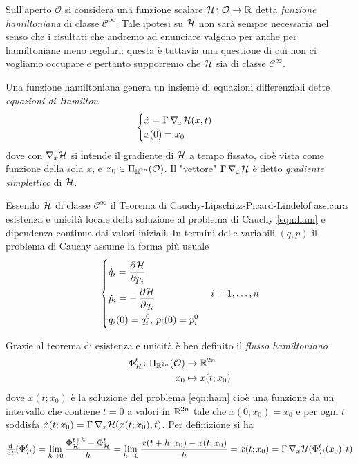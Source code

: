 Sull'aperto $ \mathcal{O} $ si considera una funzione scalare $ \mathcal{H} \colon \mathcal{O} \to \mathbb{R} $ detta \emph{funzione hamiltoniana} di classe $ \mathcal{C}^{\infty} $. Tale ipotesi su $ \mathcal{H} $ non sarà sempre necessaria nel senso che i risultati che andremo ad enunciare valgono per anche per hamiltoniane meno regolari: questa è tuttavia una questione di cui non ci vogliamo occupare e pertanto supporremo che $ \mathcal{H} $ sia di classe $ \mathcal{C}^\infty $.

Una funzione hamiltoniana genera un insieme di equazioni differenziali dette \emph{equazioni di Hamilton}
\begin{equation} \label{eqn:ham}
    \begin{cases}
    \dot{x} = \Gamma \, \nabla_x \mathcal{H}(x, t) \\
    x(0) = x_0
    \end{cases}
\end{equation}
dove con $ \nabla_x \mathcal{H} $ si intende il gradiente di $ \mathcal{H} $ a tempo fissato, cioè vista come funzione della sola $ x $, e $ x_0 \in \Pi_{\mathbb{R}^{2n}}(\mathcal{O}) $. Il "vettore" $ \Gamma \, \nabla_x \mathcal{H} $ è detto \emph{gradiente simplettico} di $ \mathcal{H} $.

Essendo $ \mathcal{H} $ di classe $ \mathcal{C}^\infty $ il Teorema di Cauchy-Lipschitz-Picard-Lindelöf assicura esistenza e unicità locale della soluzione al problema di Cauchy \eqref{eqn:ham} e dipendenza continua dai valori iniziali. In termini delle variabili $ (q, p) $ il problema di Cauchy assume la forma più usuale
\begin{equation}
    \begin{dcases}
        \dot{q}_i = \dpd{\ham}{p_i} \\
        \dot{p}_i = -\dpd{\ham}{q_i} \\
        q_i(0) = q_{i}^0, \, p_i(0) = p_i^0 \\
    \end{dcases}
    \quad i = 1, \ldots, n
\end{equation}

Grazie al teorema di esistenza e unicità è ben definito il \emph{flusso hamiltoniano}
\begin{align}
    \Phi_{\mathcal{H}}^t \colon \Pi_{\mathbb{R}^{2n}}(\mathcal{O}) & \to \mathbb{R}^{2n} \\
    x_0 & \mapsto x(t; x_0)
\end{align}
dove $ x(t; x_0) $ è la soluzione del problema \eqref{eqn:ham} cioè una funzione da un intervallo che contiene $ t=0 $ a valori in $ \mathbb{R}^{2n} $ tale che $ x(0; x_0) = x_0 $ e per ogni $ t $ soddisfa $ \dot{x}(t; x_0) = \Gamma \, \nabla_x \mathcal{H}(x(t; x_0), t) $. Per definizione si ha
\[
    \od{}{t} (\Phi^t_\ham) = \lim_{h \to 0} \frac{\Phi^{t+h}_\ham - \Phi^{t}_\ham}{h} = \lim_{h \to 0} \frac{x(t+h; x_0) - x(t; x_0)}{h} = \dot{x}(t; x_0) = \Gamma \, \nabla_x \ham(\Phi_\ham^t(x_0), t)
\]

